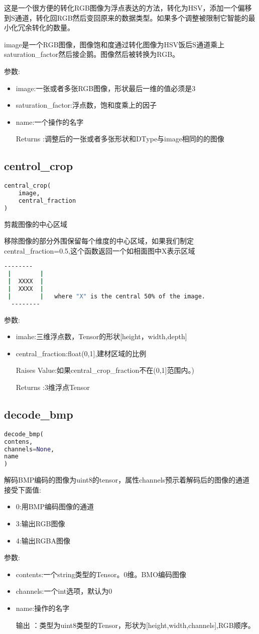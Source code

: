 这是一个很方便的转化RGB图像为浮点表达的方法，转化为HSV，添加一个偏移到S通道，转化回RGB然后变回原来的数据类型。如果多个调整被限制它智能的最小化冗余转化的数量。

image是一个RGB图像，图像饱和度通过转化图像为HSV饭后S通道乘上saturation\_factor然后接企鹅。图像然后被转换为RGB。

参数:
\begin{itemize}
		\item image:一张或者多张RGB图像，形状最后一维的值必须是3
		\item saturation\_factor:浮点数，饱和度乘上的因子
		\item name:一个操作的名字
		\item[Returns]:调整后的一张或者多张形状和DType与image相同的的图像
\end{itemize}
\subsection{centrol\_crop}
\begin{lstlisting}[language=Python]
central_crop(
    image,
    central_fraction
)
\end{lstlisting}
剪裁图像的中心区域

移除图像的部分外围保留每个维度的中心区域，如果我们制定central\_fraction=0.5,这个函数返回一个如相面图中X表示区域
\begin{lstlisting}[language=Bash]
 --------
 |        |
 |  XXXX  |
 |  XXXX  |
 |        |   where "X" is the central 50% of the image.
  --------
\end{lstlisting}
参数:
\begin{itemize}
	\item imahe:三维浮点数，Tensor的形状[height，width,depth]
	\item central\_fraction:float(0,1],建材区域的比例
	\item[Raises] Value:如果central\_crop\_fraction不在(0,1]范围内。)
	\item[Returns]:3维浮点Tensor
\end{itemize}
\subsection{decode\_bmp}
\begin{lstlisting}[language=Python]
decode_bmp(
contens,
channels=None,
name 
)
\end{lstlisting}
解码BMP编码的图像为uint8的tensor，属性channels预示着解码后的图像的通道
接受下面值:
\begin{itemize}
		\item 0:用BMP编码图像的通道
		\item 3:输出RGB图像
		\item 4:输出RGBA图像
\end{itemize}
参数:
\begin{itemize}
		\item contents:一个string类型的Tensor。0维。BMO编码图像
		\item channels:一个int选项，默认为0
		\item name:操作的名字
		\item[输出]：类型为uint8类型的Tensor，形状为[height,width,channels],RGB顺序。
\end{itemize}
